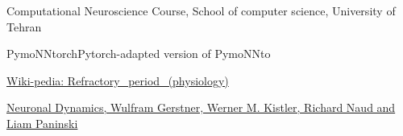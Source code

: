 \begin{thebibliography}{1}
        \begin{latin}
            Computational Neuroscience Course, School of computer science, University of Tehran
        \end{latin}
        \begin{latin}
            PymoNNtorchPytorch-adapted version of PymoNNto
        \end{latin}
        \begin{latin}
            \href{https://en.wikipedia.org/wiki/Refractory_period_(physiology)}{Wiki-pedia: Refractory\_period\_(physiology)}
        \end{latin}
        \begin{latin}
            \href{https://neuronaldynamics.epfl.ch/online/Ch12.S3.html}{Neuronal Dynamics, Wulfram Gerstner, Werner M. Kistler, Richard Naud and Liam Paninski
            }
        \end{latin}
    \end{thebibliography}